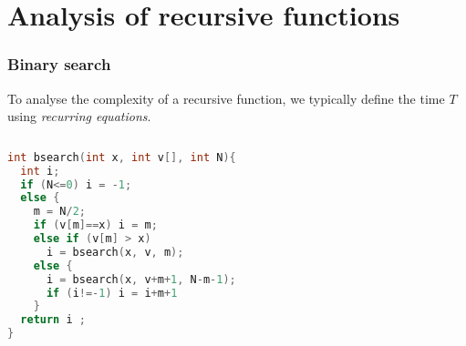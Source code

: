 \documentclass[aspectratio=169]{beamer}
\begin{document}





\section{Analysis of recursive functions}

\begin{frame}[fragile]\frametitle{Binary search}

To analyse the complexity of a recursive function, we typically define the time $T$ using \emph{recurring equations}.

\begin{columns}
\begin{column}{0.48\textwidth}
\begin{lstlisting}[language=C++,emph={bsearch}]
int bsearch(int x, int v[], int N){
  int i;
  if (N<=0) i = -1;
  else {
    m = N/2;
    if (v[m]==x) i = m;
    else if (v[m] > x)
      i = bsearch(x, v, m);
    else {
      i = bsearch(x, v+m+1, N-m-1);
      if (i!=-1) i = i+m+1
    }
  return i ;
}
\end{lstlisting}
\end{column}
  \begin{column}{0.48\textwidth}
    \small
  \end{column}
\end{columns}
\end{frame}
\end{document}
